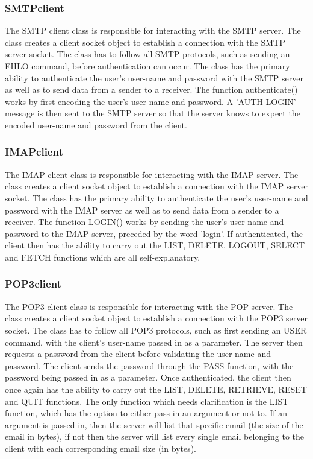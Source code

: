 \documentclass[11pt]{article}
\begin{document}
\begin{multicols}{2}
\subsubsection{SMTPclient}
The SMTP client class is responsible for interacting with the SMTP server. The class creates a client socket object to establish a connection with the SMTP server socket. The class has to follow all SMTP protocols, such as sending an EHLO command, before authentication can occur. The class has the primary ability to authenticate the user's user-name and password with the SMTP server as well as to send data from a sender to a receiver. The function authenticate() works by first encoding the user's user-name and password. A 'AUTH LOGIN' message is then sent to the SMTP server so that the server knows to expect the encoded user-name and password from the client.
\subsubsection{IMAPclient}
The IMAP client class is responsible for interacting with the IMAP server. The class creates a client socket object to establish a connection with the IMAP server socket. The class has the primary ability to authenticate the user's user-name and password with the IMAP server as well as to send data from a sender to a receiver. The function LOGIN() works by sending the user's user-name and password to the IMAP server, preceded by the word 'login'. If authenticated, the client then has the ability to carry out the LIST, DELETE, LOGOUT, SELECT and FETCH functions which are all self-explanatory.
\subsubsection{POP3client}
The POP3 client class is responsible for interacting with the POP server. The class creates a client socket object to establish a connection with the POP3 server socket. The class has to follow all POP3 protocols, such as first sending an USER command, with the client's user-name passed in as a parameter. The server then requests a password from the client before validating the user-name and password. The client sends the password through the PASS function, with the password being passed in as a parameter. Once authenticated, the client then once again has the ability to carry out the LIST, DELETE, RETRIEVE, RESET and QUIT functions. The only function which needs clarification is the LIST function, which has the option to either pass in an argument or not to. If an argument is passed in, then the server will list that specific email (the size of the email in bytes), if not then the server will list every single email belonging to the client with each corresponding email size (in bytes).

\end{multicols}
\end{document}
